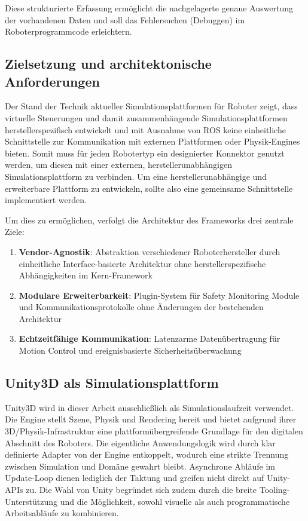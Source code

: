 Diese strukturierte Erfassung ermöglicht die nachgelagerte genaue Auswertung der
vorhandenen Daten und soll das Fehlersuchen (Debuggen) im Roboterprogrammcode
erleichtern.

\subsection{Zielsetzung und architektonische Anforderungen}
Der Stand der Technik aktueller Simulationsplattformen für Roboter zeigt, dass
virtuelle Steuerungen und damit zusammenhängende Simulationsplattformen
herstellerspezifisch entwickelt und mit Ausnahme von ROS keine einheitliche
Schnittstelle zur Kommunikation mit externen Plattformen oder Physik-Engines
bieten. Somit muss für jeden Robotertyp ein designierter Konnektor genutzt
werden, um diesen mit einer externen, herstellerunabhängigen
Simulationsplattform
zu verbinden. Um eine herstellerunabhängige und erweiterbare Plattform zu
entwickeln, sollte also eine gemeinsame Schnittstelle implementiert werden.

Um dies zu ermöglichen, verfolgt die Architektur des Frameworks drei
zentrale Ziele:
\begin{enumerate}
  \item \textbf{Vendor-Agnostik}: Abstraktion verschiedener
    Roboterhersteller durch einheitliche Interface-basierte
    Architektur ohne herstellerspezifische Abhängigkeiten im Kern-Framework

  \item \textbf{Modulare Erweiterbarkeit}: Plugin-System für Safety
    Monitoring Module und Kommunikationsprotokolle ohne Änderungen
    der bestehenden Architektur

  \item \textbf{Echtzeitfähige Kommunikation}: Latenzarme
    Datenübertragung für Motion Control und ereignisbasierte
    Sicherheitsüberwachung
\end{enumerate}

\subsection{Unity3D als Simulationsplattform}

Unity3D wird in dieser Arbeit ausschließlich als
Simulations\-laufzeit verwendet.
Die Engine stellt Szene, Physik und Rendering bereit und bietet aufgrund ihrer
3D/Physik-Infrastruktur eine plattformübergreifende Grundlage für den
digitalen Abschnitt des Roboters. Die eigentliche
Anwendungslogik wird durch klar definierte Adapter von der Engine entkoppelt,
wodurch eine strikte Trennung zwischen Simulation und Domäne gewahrt bleibt.
Asynchrone Abläufe im Update-Loop dienen lediglich der Taktung und greifen
nicht direkt auf Unity-APIs zu. Die Wahl von Unity begründet sich zudem durch
die breite Tooling-Unterstützung und die Möglichkeit, sowohl visuelle als auch
programmatische Arbeitsabläufe zu kombinieren.

